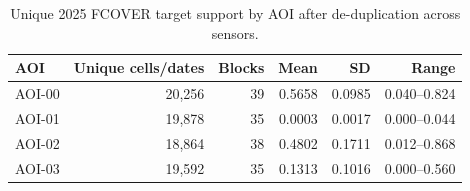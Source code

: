 \begin{table}[!htbp]\centering\footnotesize
\caption{Unique 2025 FCOVER target support by AOI after de-duplication across sensors.}\label{tab:aoisupport}
\begin{tabular}{lrrrrr}\toprule
AOI & Unique cells/dates & Blocks & Mean & SD & Range \\\midrule
AOI-00 & 20,256 & 39 & 0.5658 & 0.0985 & 0.040--0.824 \\
AOI-01 & 19,878 & 35 & 0.0003 & 0.0017 & 0.000--0.044 \\
AOI-02 & 18,864 & 38 & 0.4802 & 0.1711 & 0.012--0.868 \\
AOI-03 & 19,592 & 35 & 0.1313 & 0.1016 & 0.000--0.560 \\
\bottomrule\end{tabular}
\end{table}
